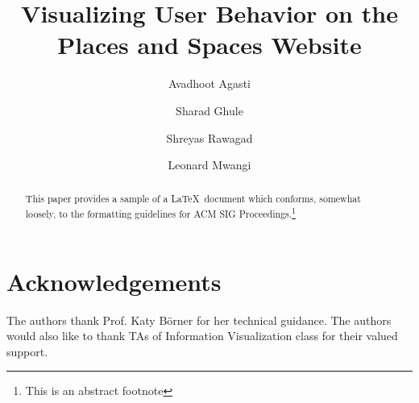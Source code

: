 \documentclass[sigconf]{acmart}
\begin{document}
\title{Visualizing User Behavior on the Places and Spaces Website}

\author{Avadhoot Agasti}

\author{Sharad Ghule}

\author{Shreyas Rawagad}

\author{Leonard Mwangi}


\begin{abstract}
This paper provides a sample of a \LaTeX\ document which conforms,
somewhat loosely, to the formatting guidelines for
ACM SIG Proceedings.\footnote{This is an abstract footnote}
\end{abstract}



\maketitle











\appendix


\section{Acknowledgements}
 The authors thank Prof. Katy Börner for her technical guidance. The
 authors would also like to thank TAs of Information Visualization class for their valued
 support.



 
\end{document}
